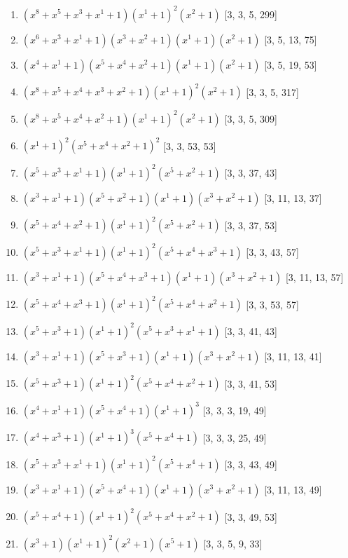 \documentclass[10pt,twocolumn]{article}
\begin{document}
\begin{enumerate}
\item $(x^{8} + x^{5} + x^{3} + x^{1} + 1)(x^{1} + 1)^{2}(x^{2} + 1)$  [3, 3, 5, 299]
\item $(x^{6} + x^{3} + x^{1} + 1)(x^{3} + x^{2} + 1)(x^{1} + 1)(x^{2} + 1)$  [3, 5, 13, 75]
\item $(x^{4} + x^{1} + 1)(x^{5} + x^{4} + x^{2} + 1)(x^{1} + 1)(x^{2} + 1)$  [3, 5, 19, 53]
\item $(x^{8} + x^{5} + x^{4} + x^{3} + x^{2} + 1)(x^{1} + 1)^{2}(x^{2} + 1)$  [3, 3, 5, 317]
\item $(x^{8} + x^{5} + x^{4} + x^{2} + 1)(x^{1} + 1)^{2}(x^{2} + 1)$  [3, 3, 5, 309]
\item $(x^{1} + 1)^{2}(x^{5} + x^{4} + x^{2} + 1)^{2}$  [3, 3, 53, 53]
\item $(x^{5} + x^{3} + x^{1} + 1)(x^{1} + 1)^{2}(x^{5} + x^{2} + 1)$  [3, 3, 37, 43]
\item $(x^{3} + x^{1} + 1)(x^{5} + x^{2} + 1)(x^{1} + 1)(x^{3} + x^{2} + 1)$  [3, 11, 13, 37]
\item $(x^{5} + x^{4} + x^{2} + 1)(x^{1} + 1)^{2}(x^{5} + x^{2} + 1)$  [3, 3, 37, 53]
\item $(x^{5} + x^{3} + x^{1} + 1)(x^{1} + 1)^{2}(x^{5} + x^{4} + x^{3} + 1)$  [3, 3, 43, 57]
\item $(x^{3} + x^{1} + 1)(x^{5} + x^{4} + x^{3} + 1)(x^{1} + 1)(x^{3} + x^{2} + 1)$  [3, 11, 13, 57]
\item $(x^{5} + x^{4} + x^{3} + 1)(x^{1} + 1)^{2}(x^{5} + x^{4} + x^{2} + 1)$  [3, 3, 53, 57]
\item $(x^{5} + x^{3} + 1)(x^{1} + 1)^{2}(x^{5} + x^{3} + x^{1} + 1)$  [3, 3, 41, 43]
\item $(x^{3} + x^{1} + 1)(x^{5} + x^{3} + 1)(x^{1} + 1)(x^{3} + x^{2} + 1)$  [3, 11, 13, 41]
\item $(x^{5} + x^{3} + 1)(x^{1} + 1)^{2}(x^{5} + x^{4} + x^{2} + 1)$  [3, 3, 41, 53]
\item $(x^{4} + x^{1} + 1)(x^{5} + x^{4} + 1)(x^{1} + 1)^{3}$  [3, 3, 3, 19, 49]
\item $(x^{4} + x^{3} + 1)(x^{1} + 1)^{3}(x^{5} + x^{4} + 1)$  [3, 3, 3, 25, 49]
\item $(x^{5} + x^{3} + x^{1} + 1)(x^{1} + 1)^{2}(x^{5} + x^{4} + 1)$  [3, 3, 43, 49]
\item $(x^{3} + x^{1} + 1)(x^{5} + x^{4} + 1)(x^{1} + 1)(x^{3} + x^{2} + 1)$  [3, 11, 13, 49]
\item $(x^{5} + x^{4} + 1)(x^{1} + 1)^{2}(x^{5} + x^{4} + x^{2} + 1)$  [3, 3, 49, 53]
\item $(x^{3} + 1)(x^{1} + 1)^{2}(x^{2} + 1)(x^{5} + 1)$  [3, 3, 5, 9, 33]

\end{enumerate}
\end{document}
